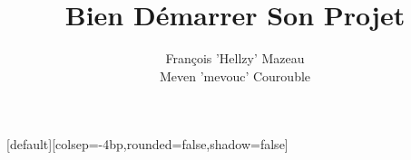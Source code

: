 [default][colsep=-4bp,rounded=false,shadow=false]
\title{Bien Démarrer Son Projet}
\author{François 'Hellzy' Mazeau \\ Meven 'mevouc' Courouble}
